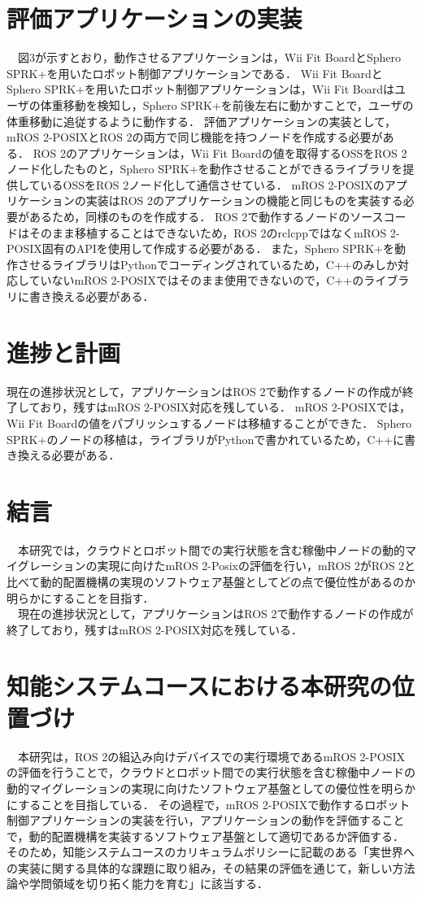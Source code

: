 \documentclass[11pt]{ujarticle}
\begin{document}
\section{評価アプリケーションの実装}
　図3が示すとおり，動作させるアプリケーションは，Wii Fit BoardとSphero SPRK+を用いたロボット制御アプリケーションである．
Wii Fit BoardとSphero SPRK+を用いたロボット制御アプリケーションは，Wii Fit Boardはユーザの体重移動を検知し，Sphero SPRK+を前後左右に動かすことで，ユーザの体重移動に追従するように動作する．
評価アプリケーションの実装として，mROS 2-POSIXとROS 2の両方で同じ機能を持つノードを作成する必要がある．
ROS 2のアプリケーションは，Wii Fit Boardの値を取得するOSSをROS 2ノード化したものと，Sphero SPRK+を動作させることができるライブラリを提供しているOSSをROS 2ノード化して通信させている．
mROS 2-POSIXのアプリケーションの実装はROS 2のアプリケーションの機能と同じものを実装する必要があるため，同様のものを作成する．
ROS 2で動作するノードのソースコードはそのまま移植することはできないため，ROS 2のrclcppではなくmROS 2-POSIX固有のAPIを使用して作成する必要がある．
また，Sphero SPRK+を動作させるライブラリはPythonでコーディングされているため，C++のみしか対応していないmROS 2-POSIXではそのまま使用できないので，C++のライブラリに書き換える必要がある．
\section{進捗と計画}
現在の進捗状況として，アプリケーションはROS 2で動作するノードの作成が終了しており，残すはmROS 2-POSIX対応を残している．
mROS 2-POSIXでは，Wii Fit Boardの値をパブリッシュするノードは移植することができた．
Sphero SPRK+のノードの移植は，ライブラリがPythonで書かれているため，C++に書き換える必要がある．

\section{結言}
　本研究では，クラウドとロボット間での実行状態を含む稼働中ノードの動的マイグレーションの実現に向けたmROS 2-Posixの評価を行い，mROS 2がROS 2と比べて動的配置機構の実現のソフトウェア基盤としてどの点で優位性があるのか明らかにすることを目指す．
\\　現在の進捗状況として，アプリケーションはROS 2で動作するノードの作成が終了しており，残すはmROS 2-POSIX対応を残している．

\section{知能システムコースにおける本研究の位置づけ}
　本研究は，ROS 2の組込み向けデバイスでの実行環境であるmROS 2-POSIXの評価を行うことで，クラウドとロボット間での実行状態を含む稼働中ノードの動的マイグレーションの実現に向けたソフトウェア基盤としての優位性を明らかにすることを目指している．
その過程で，mROS 2-POSIXで動作するロボット制御アプリケーションの実装を行い，アプリケーションの動作を評価することで，動的配置機構を実装するソフトウェア基盤として適切であるか評価する．
そのため，知能システムコースのカリキュラムポリシーに記載のある「実世界への実装に関する具体的な課題に取り組み，その結果の評価を通じて，新しい方法論や学問領域を切り拓く能力を育む」に該当する．
\end{document}
